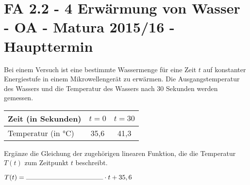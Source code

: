 \section{FA 2.2 - 4 Erwärmung von Wasser - OA - Matura 2015/16 - Haupttermin}

\begin{beispiel}[FA 2.2]{1} %
Bei einem Versuch ist eine bestimmte Wassermenge für eine Zeit $t$ auf konstanter Energiestufe in einem Mikrowellengerät zu erwärmen. Die Ausgangstemperatur des Wassers und die Temperatur
des Wassers nach 30 Sekunden werden gemessen.

\begin{center}
\begin{tabular}{|l|c|c|} \hline
\cellcolor{gray!30}Zeit (in Sekunden) & $t=0$ & $t=30$ \\ \hline
\cellcolor{gray!30}Temperatur (in °C) & 35,6 & 41,3 \\ \hline
\end{tabular}
\end{center} \leer

Ergänze die Gleichung der zugehörigen linearen Funktion, die die Temperatur $T(t)$ zum Zeitpunkt
$t$ beschreibt. \leer

$T(t) = \rule{4cm}{0.3pt} \cdot t + 35,6$

\end{beispiel}